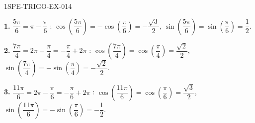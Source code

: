 \begin{corrige}{1SPE-TRIGO-EX-014}

\textbf{1.} $\dfrac{5\pi}{6} = \pi - \dfrac{\pi}{6}$ :
$\cos\!\left(\dfrac{5\pi}{6}\right) = -\cos\!\left(\dfrac{\pi}{6}\right) = -\dfrac{\sqrt{3}}{2}$, \quad
$\sin\!\left(\dfrac{5\pi}{6}\right) = \sin\!\left(\dfrac{\pi}{6}\right) = \dfrac{1}{2}$.

\textbf{2.} $\dfrac{7\pi}{4} = 2\pi - \dfrac{\pi}{4} = -\dfrac{\pi}{4} + 2\pi$ :
$\cos\!\left(\dfrac{7\pi}{4}\right) = \cos\!\left(\dfrac{\pi}{4}\right) = \dfrac{\sqrt{2}}{2}$, \quad
$\sin\!\left(\dfrac{7\pi}{4}\right) = -\sin\!\left(\dfrac{\pi}{4}\right) = -\dfrac{\sqrt{2}}{2}$.

\textbf{3.} $\dfrac{11\pi}{6} = 2\pi - \dfrac{\pi}{6} = -\dfrac{\pi}{6} + 2\pi$ :
$\cos\!\left(\dfrac{11\pi}{6}\right) = \cos\!\left(\dfrac{\pi}{6}\right) = \dfrac{\sqrt{3}}{2}$, \quad
$\sin\!\left(\dfrac{11\pi}{6}\right) = -\sin\!\left(\dfrac{\pi}{6}\right) = -\dfrac{1}{2}$.

\end{corrige}
